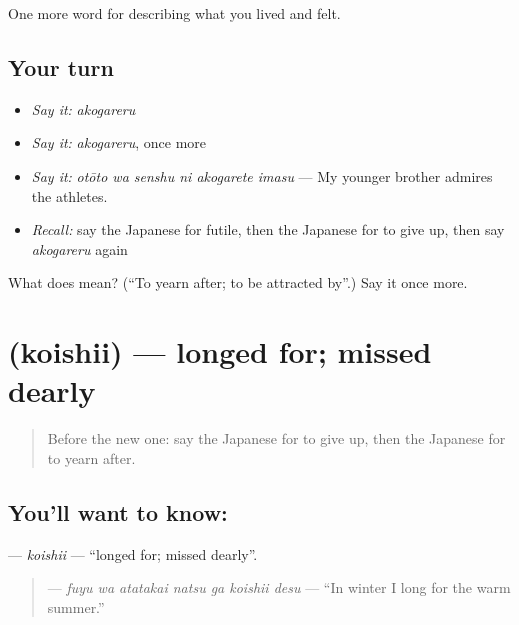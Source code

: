 \begin{grammarlens}[title={What you've built}]
One more word for describing what you lived and felt.
\end{grammarlens}

\subsection*{Your turn}
\begin{itemize}
\raggedright
  \item \emph{Say it:} \emph{akogareru}
  \item \emph{Say it:} \emph{akogareru}, once more
  \item \emph{Say it:} \emph{otōto wa senshu ni akogarete imasu} — My younger brother admires the athletes.
  \item \emph{Recall:} say the Japanese for futile, then the Japanese for to give up, then say \emph{akogareru} again
\end{itemize}

\begin{tcolorbox}[breakable,colback=teal!4,colframe=teal!35!black,title={Before you move on}]
What does  mean? (\textquotedblleft{}To yearn after; to be attracted by\textquotedblright{}.) Say it once more.
\end{tcolorbox}
\section[\texorpdfstring{\ja{こいしい} (koishii)}{こいしい (koishii)}]{ (koishii) — longed for; missed dearly}

\label{lesson:JA-C433-koishii}



\begin{quote}
Before the new one: say the Japanese for to give up, then the Japanese for to yearn after.
\end{quote}

\subsection*{You'll want to know: }
\textbf{} — \emph{koishii} — \textquotedblleft{}longed for; missed dearly\textquotedblright{}.

\begin{quote}
\textbf{   } — \emph{fuyu wa atatakai natsu ga koishii desu} — \textquotedblleft{}In winter I long for the warm summer.\textquotedblright{}
\end{quote}

